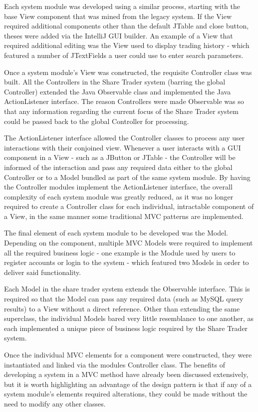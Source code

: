 \documentclass[12pt, a4paper,titlepage]{article}
\begin{document}
Each system module was developed using a similar process, starting with the
base View component that was mined from the legacy system. 
If the View required additional components other than the default JTable and
close button, theses were added via the IntelliJ GUI builder. 
An example of a View that required additional editing was the View used to
display trading history - which featured a number of JTextFields a user could
use to enter search parameters.

Once a system module’s View was constructed, the requisite Controller class
was built. 
All the Controllers in the Share Trader system (barring the global Controller)
extended the Java Observable class and implemented the Java ActionListener
interface. 
The reason Controllers were made Observable was so that any information
regarding the current focus of the Share Trader system could be passed back to
the global Controller for processing.  

The ActionListener interface allowed the Controller classes to process any
user interactions with their conjoined view. 
Whenever a user interacts with a GUI component in a View - such as a JButton or
JTable - the Controller will be informed of the interaction and pass any
required data either to the global Controller or to a Model bundled as part of
the same system module.
By having the Controller modules implement the ActionListener interface, the
overall complexity of each system module was greatly reduced, as it was no
longer required to create a Controller class for each individual, intractable
component of a View, in the same manner some traditional MVC patterns are
implemented.

The final element of each system module to be developed was the Model. 
Depending on the component, multiple MVC Models were required to implement all
the required business logic - one example is the Module used by users to
register accounts or login to the system - which featured two Models in order
to deliver said functionality.

Each Model in the share trader system extends the Observable interface. 
This is required so that the Model can pass any required data (such as MySQL
query results) to a View without a direct reference.
Other than extending the same superclass, the individual Models bared very
little resemblance to one another, as each implemented a unique piece of
business logic required by the Share Trader system.

Once the individual MVC elements for a component were constructed, they were
instantiated and linked via the modules Controller class. 
The benefits of developing a system in a MVC method have already been discussed
extensively, but it is worth highlighting an advantage of the design pattern
is that if any of a system module’s elements  required alterations, they could
be made without the need to modify any other classes.
\end{document}
